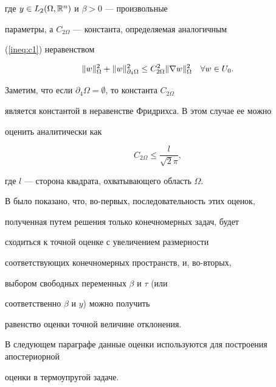 где $y\in L_2(\Omega,{\Bbb R}^n)$ и $\beta>0$ --- произвольные


параметры, а $C_{2\Omega}$ --- константа, определяемая аналогичным


(\ref{ineq:c1}) неравенством


\begin{equation*}




\norm{w}^2_{\Omega}  + \norm{w}^2_{\partial_4\Omega}


\le C_{2\Omega}^2 \norm{\nabla w}^2_{\Omega} \quad \forall w\in U_0.


\end{equation*}





Заметим, что если $\partial_4\Omega=\emptyset$, то константа $C_{2\Omega}$


является константой в неравенстве Фридрихса. В этом случае ее можно


оценить аналитически как


$$


C_{2\Omega}\le \frac{l}{\sqrt{2}\pi},


$$


где $l$ --- сторона квадрата, охватывающего область $\Omega$.








В \cite{Re3} было показано, что, во-первых, последовательность этих оценок,


полученная путем решения только конечномерных задач, будет


сходиться к точной оценке с увеличением размерности


соответствующих конечномерных пространств, и, во-вторых,


выбором свободных переменных $\beta$ и $\tau$ (или


соответственно $\beta$ и $y$) можно получить


равенство оценки точной величине отклонения.





В следующем параграфе данные оценки используются для построения апостериорной


оценки в термоупругой задаче.








